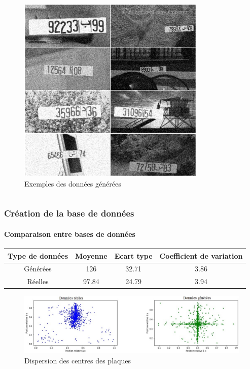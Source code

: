 \begin{frame}
\begin{columns}
\begin{column}{6cm}
\begin{figure}
\begin{overprint}
            \centering\includegraphics[width=0.8\textwidth]{figures/Data_gen.PNG}\caption{Exemples des données générées}
        \end{overprint}
    \end{figure}
\end{column}
\end{columns}
\end{frame}



\begin{frame}
\frametitle{Création de la base de données}
\framesubtitle{Comparaison entre bases de données}
\begin{table}

\begin{tabular}{c|c|c|c}
    Type de données  &  Moyenne  &  Ecart type &  Coefficient de variation \\
    \hline
    Générées         &  126      &  32.71      &  3.86  \\
    Réelles          &  97.84    &  24.79      &  3.94
\end{tabular}
\end{table}
\centering
\begin{figure}
    \includegraphics[width=1\textwidth]{figures/Data_dispers.PNG}\caption{Dispersion des centres des plaques}
\end{figure}
\end{frame}

